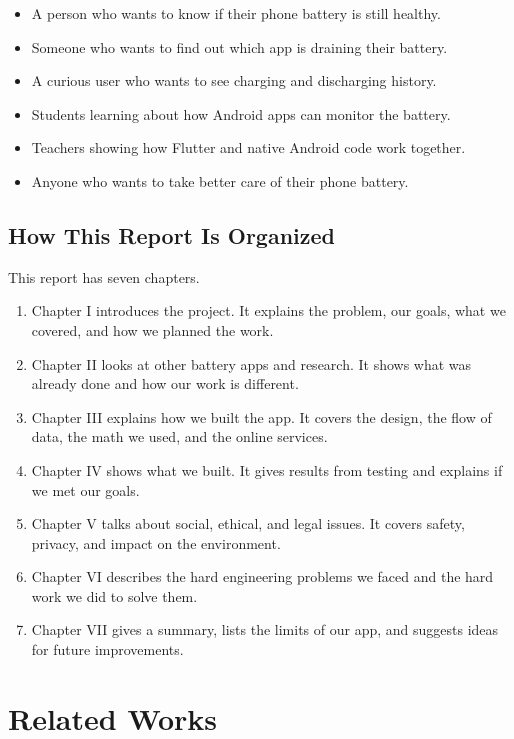 \documentclass[12pt,a4paper]{report}
\begin{document}
\begin{itemize}
    \item A person who wants to know if their phone battery is still healthy.
    \item Someone who wants to find out which app is draining their battery.
    \item A curious user who wants to see charging and discharging history.
    \item Students learning about how Android apps can monitor the battery.
    \item Teachers showing how Flutter and native Android code work together.
    \item Anyone who wants to take better care of their phone battery.
\end{itemize}

\section{How This Report Is Organized}
This report has seven chapters.

\begin{enumerate}
    \item Chapter I introduces the project. It explains the problem, our goals, what we covered, and how we planned the work.
    \item Chapter II looks at other battery apps and research. It shows what was already done and how our work is different.
    \item Chapter III explains how we built the app. It covers the design, the flow of data, the math we used, and the online services.
    \item Chapter IV shows what we built. It gives results from testing and explains if we met our goals.
    \item Chapter V talks about social, ethical, and legal issues. It covers safety, privacy, and impact on the environment.
    \item Chapter VI describes the hard engineering problems we faced and the hard work we did to solve them.
    \item Chapter VII gives a summary, lists the limits of our app, and suggests ideas for future improvements.
\end{enumerate}


\chapter{Related Works}
\end{document}
